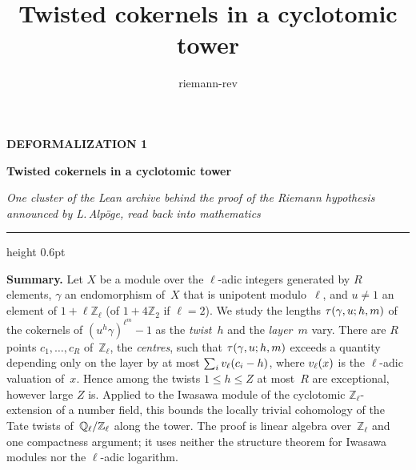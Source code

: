 \documentclass[11pt,a4paper]{article}
\title{Twisted cokernels in a cyclotomic tower}
\author{riemann-rev}
\date{}
\newcommand{\Z}{\mathbb{Z}}
\newcommand{\kw}[1]{\emph{#1}}
\newcommand{\m}[1]{\mbox{$#1$}}        %
\theoremstyle{plainx}
\theoremstyle{uprightx}
\begin{document}
\color{ink}

{\raggedright
{\sffamily\bfseries\fontsize{7.2}{9}\selectfont\color{leancol}DEFORMALIZATION 1\par}
\vspace{5pt}
{\fontsize{21.5}{25.5}\selectfont\bfseries Twisted cokernels in a cyclotomic tower\par}
\vspace{5pt}
{\fontsize{12.4}{16}\selectfont\itshape\color{inksoft} One cluster of the Lean archive behind the proof of the Riemann
hypothesis announced by L.\,Alpöge, read back into mathematics\par}}
\vspace{8pt}
{\color{rulegrey}\hrule height 0.6pt}
\vspace{7pt}
\thispagestyle{empty}

\textbf{Summary.} Let $X$ be a module over the $\ell$-adic integers generated by $R$ elements, $\gamma$ an
endomorphism of~$X$ that is unipotent modulo~$\ell$, and \m{u\ne1} an element of \m{1+\ell\Z_\ell} (of
\m{1+4\Z_2} if \m{\ell=2}). We study the lengths $\tau(\gamma,u;h,m)$ of
the cokernels of $(u^h\gamma)^{\ell^m}-1$ as the \kw{twist}~$h$ and the \kw{layer}~$m$ vary. There are $R$ points
\m{c_1,\dots,c_R} of~$\Z_\ell$, the \kw{centres}, such that $\tau(\gamma,u;h,m)$ exceeds a quantity depending only on the layer by at most
$\sum_i v_{\ell}(c_i-h)$, where $v_{\ell}(x)$ is the $\ell$-adic valuation of~$x$. Hence among the twists \m{1\le h\le Z} at most~$R$ are exceptional, however large $Z$ is.
Applied to the Iwasawa module of the cyclotomic $\Z_\ell$-extension of a number field, this bounds the locally
trivial cohomology of the Tate twists of~$\QZl{\ell}$ along the tower. The proof is linear algebra over~$\Z_\ell$ and one
compactness argument; it uses neither the structure theorem for Iwasawa modules nor the $\ell$-adic logarithm.
\end{document}

